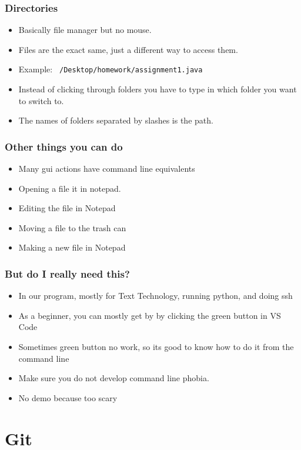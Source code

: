 \documentclass[aspectratio=169,hyperref={unicode}]{beamer}
\begin{document}
\begin{frame}[fragile]
\frametitle{Directories}
\begin{itemize}
\item Basically file manager but no mouse.
        \item Files are the exact same, just a different way to access them.
\item Example: \texttt{~/Desktop/homework/assignment1.java}

        \item Instead of clicking through folders you have to type in which folder you want to switch to.
        \item The names of folders separated by slashes is the path.
\end{itemize}
\end{frame}


\begin{frame}[fragile]
\frametitle{Other things you can do}
\begin{itemize}
        \item Many gui actions have command line equivalents
\item Opening a file it in notepad.
  \item Editing the file in Notepad
        \item Moving a file to the trash can
        \item Making a new file in Notepad
\end{itemize}
\end{frame}


\begin{frame}
\frametitle{But do I really need this?}
\begin{itemize}
        \item In our program, mostly for Text Technology, running python, and doing ssh
\item As a beginner, you can mostly get by by clicking the green button in VS Code
\item Sometimes green button no work, so its good to know how to do it from the command line
\item Make sure you do not develop command line phobia.
        \item No demo because too scary
\end{itemize}
\end{frame}



\section{Git}
\end{document}
